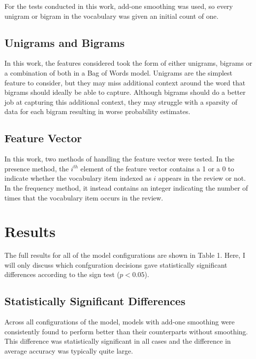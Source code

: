 \documentclass[twocolumn]{article}
\begin{document}
For the tests conducted in this work, add-one smoothing was used, so every unigram or bigram in the vocabulary was given an initial count of one.

\subsection{Unigrams and Bigrams}

In this work, the features considered took the form of either unigrams, bigrams or a combination of both in a Bag of Words model. Unigrams are the simplest feature to consider, but they may miss additional context around the word that bigrams should ideally be able to capture. Although bigrams should do a better job at capturing this additional context, they may struggle with a sparsity of data for each bigram resulting in worse probability estimates.

\subsection{Feature Vector}

In this work, two methods of handling the feature vector were tested. In the presence method, the $i^{th}$ element of the feature vector contains a 1 or a 0 to indicate whether the vocabulary item indexed as $i$ appears in the review or not. In the frequency method, it instead contains an integer indicating the number of times that the vocabulary item occurs in the review.

\section{Results}

The full results for all of the model configurations are shown in Table 1. Here, I will only discuss which confguration decisions gave statistically significant differences according to the sign test ($p < 0.05$).

\subsection{Statistically Significant Differences}

Across all configurations of the model, models with add-one smoothing were consistently found to perform better than their counterparts without smoothing. This difference was statistically significant in all cases and the difference in average accuracy was typically quite large.
\end{document}

